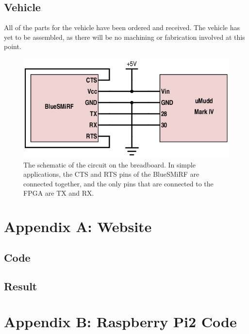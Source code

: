 \documentclass[11pt]{article}
\begin{document}
\subsection{Vehicle}
All of the parts for the vehicle have been ordered and received. The vehicle has yet to be assembled, as there will be no machining or fabrication involved at this point.

\begin{figure}
\begin{center}
\includegraphics{breadboard}
\end{center}
\caption{The schematic of the circuit on the breadboard. In simple applications, the CTS and RTS pins of the BlueSMiRF are connected together, and the only pins that are connected to the FPGA are TX and RX.}
\label{fig:breadboard}
\end{figure}



\section{Appendix A: Website}
\subsection{Code}

\subsection{Result}

\section{Appendix B: Raspberry Pi2 Code}
\end{document}

